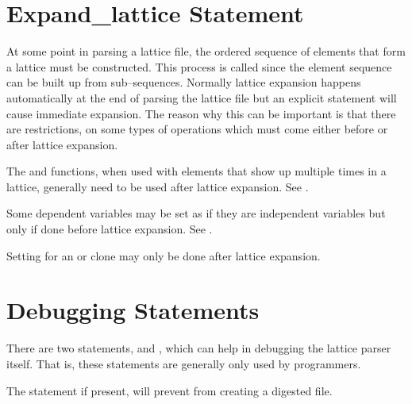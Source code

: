 \section{Expand\_lattice Statement}
\label{s:lat_expand}

At some point in parsing a lattice file, the ordered sequence of
elements that form a lattice must be constructed. This process is
called  since the element sequence can be built
up from sub--sequences. Normally lattice expansion happens
automatically at the end of parsing the lattice file but an explicit
 statement will cause immediate expansion. The
reason why this can be important is that there are restrictions, on
some types of operations which must come either before or after
lattice expansion. 
\begin{Itemize}
\item 
{}
The  and  functions, when used with elements
that show up multiple times in a lattice, generally need to be used
after lattice expansion. See .
\item 
Some dependent variables may be set as if they are independent
variables but only if done before lattice expansion. See
.
\item 
Setting  for an  or  clone may only
be done after lattice expansion.
\end{Itemize}

\section{Debugging Statements}

There are two statements,  and ,
which can help in debugging the \bmad lattice parser
itself.  That is, these statements are generally only used by programmers.

The  statement if present, will prevent \bmad from 
creating a digested file. 

